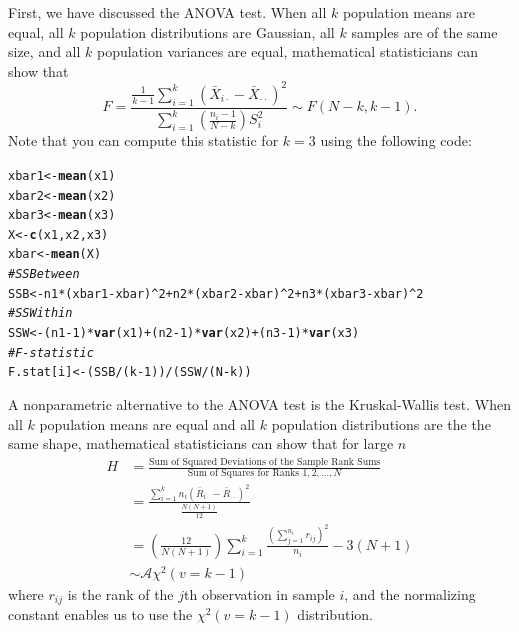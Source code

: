 \documentclass{article}\usepackage[]{graphicx}\usepackage[]{xcolor}
\makeatletter
\newcommand{\hlnum}[1]{\textcolor[rgb]{0.686,0.059,0.569}{#1}}%
\newcommand{\hlcom}[1]{\textcolor[rgb]{0.678,0.584,0.686}{\textit{#1}}}%
\newcommand{\hlopt}[1]{\textcolor[rgb]{0,0,0}{#1}}%
\newcommand{\hldef}[1]{\textcolor[rgb]{0.345,0.345,0.345}{#1}}%
\newcommand{\hlkwb}[1]{\textcolor[rgb]{0.69,0.353,0.396}{#1}}%
\newcommand{\hlkwd}[1]{\textcolor[rgb]{0.737,0.353,0.396}{\textbf{#1}}}%
\newenvironment{kframe}{%
 \def\at@end@of@kframe{}%
 \ifinner\ifhmode%
  \def\at@end@of@kframe{\end{minipage}}%
  \begin{minipage}{\columnwidth}%
 \fi\fi%
 \def\FrameCommand##1{\hskip\@totalleftmargin \hskip-\fboxsep
 \colorbox{shadecolor}{##1}\hskip-\fboxsep
     \hskip-\linewidth \hskip-\@totalleftmargin \hskip\columnwidth}%
 \MakeFramed {\advance\hsize-\width
   \@totalleftmargin\z@ \linewidth\hsize
   \@setminipage}}%
 {\par\unskip\endMakeFramed%
 \at@end@of@kframe}
\newenvironment{knitrout}{}{} %
\makeatother
\begin{document}
\begin{enumerate}
First, we have discussed the ANOVA test. When all $k$ population means are 
equal, all $k$ population distributions are Gaussian, all $k$ samples are
of the same size, and all $k$ population variances are equal, mathematical 
statisticians can show that
\[F = \frac{\frac{1}{k-1} \sum_{i=1}^k \left(\bar{X}_{i\cdot}-\bar{X}_{\cdot\cdot}\right)^2}{\sum_{i=1}^k\left(\frac{n_i-1}{N-k}\right)S_i^2} \sim F(N-k, k-1).\]
Note that you can compute this statistic for $k=3$ using the following code:
\begin{knitrout}\scriptsize
{}\color{fgcolor}\begin{kframe}
\begin{alltt}
\hldef{xbar1} \hlkwb{<-} \hlkwd{mean}\hldef{(x1)}
\hldef{xbar2} \hlkwb{<-} \hlkwd{mean}\hldef{(x2)}
\hldef{xbar3} \hlkwb{<-} \hlkwd{mean}\hldef{(x3)}
\hldef{X} \hlkwb{<-} \hlkwd{c}\hldef{(x1, x2, x3)}
\hldef{xbar} \hlkwb{<-} \hlkwd{mean}\hldef{(X)}
\hlcom{# SSBetween}
\hldef{SSB} \hlkwb{<-} \hldef{n1}\hlopt{*}\hldef{(xbar1}\hlopt{-}\hldef{xbar)}\hlopt{^}\hlnum{2} \hlopt{+} \hldef{n2}\hlopt{*}\hldef{(xbar2}\hlopt{-}\hldef{xbar)}\hlopt{^}\hlnum{2} \hlopt{+} \hldef{n3}\hlopt{*}\hldef{(xbar3}\hlopt{-}\hldef{xbar)}\hlopt{^}\hlnum{2}
\hlcom{# SSWithin}
\hldef{SSW} \hlkwb{<-} \hldef{(n1}\hlopt{-}\hlnum{1}\hldef{)}\hlopt{*}\hlkwd{var}\hldef{(x1)} \hlopt{+} \hldef{(n2}\hlopt{-}\hlnum{1}\hldef{)}\hlopt{*}\hlkwd{var}\hldef{(x2)} \hlopt{+} \hldef{(n3}\hlopt{-}\hlnum{1}\hldef{)}\hlopt{*}\hlkwd{var}\hldef{(x3)}
\hlcom{# F-statistic}
\hldef{F.stat[i]} \hlkwb{<-} \hldef{(SSB}\hlopt{/}\hldef{(k}\hlopt{-}\hlnum{1}\hldef{))}\hlopt{/}\hldef{(SSW}\hlopt{/}\hldef{(N}\hlopt{-}\hldef{k))}
\end{alltt}
\end{kframe}
\end{knitrout}
A nonparametric alternative to the ANOVA test is the Kruskal-Wallis test. When 
all $k$ population means are equal and all $k$ population distributions are the
the same shape, mathematical statisticians can show that for large $n$
\begin{align*}
H &= \frac{\textrm{Sum of Squared Deviations of the Sample Rank Sums}}{\textrm{Sum of Squares for Ranks }1, 2, ..., N}\\
&= \frac{\sum_{i=1}^k n_i(\bar{R}_{i\cdot} - \bar{R}_{\cdot\cdot})^2}{\frac{N(N+1)}{12}}\\
&= \left(\frac{12}{N(N+1)}\right) \sum_{i=1}^k \frac{\left(\sum_{j=1}^{n_i} r_{ij}\right)^2}{n_i}
- 3(N+1) \tag{Simplified Computing Formula}\\
& \sim \mathcal{A}\chi^2(v=k-1)
\end{align*}
where $r_{ij}$ is the rank of the $j$th observation in sample $i$, and the 
normalizing constant enables us to use the $\chi^2(v=k-1)$ distribution.\\


\end{enumerate}
\end{document}
